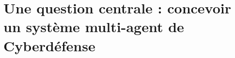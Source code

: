\documentclass[ twoside,openright,titlepage,numbers=noenddot,headinclude,%
                footinclude=true,cleardoublepage=empty,abstractoff, %
                BCOR=5mm,paper=a4,fontsize=11pt,%
                french,american,%
                ]{scrreprt}
\begin{document}
\section{Une question centrale : concevoir un système multi-agent de Cyberdéfense}\label{sec:problematique-sma-aica}

\end{document}
